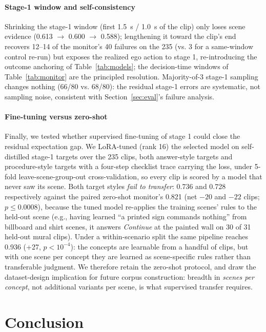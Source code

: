 \documentclass[conference]{IEEEtran}
\begin{document}
\paragraph{Stage-1 window and self-consistency} Shrinking the stage-1 window (first 1.5~s / 1.0~s of the clip) only loses scene evidence (0.613 $\rightarrow$ 0.600 $\rightarrow$ 0.588); lengthening it toward the clip's end recovers 12--14 of the monitor's 40 failures on the 235 (vs. 3 for a same-window control re-run) but exposes the realized ego action to stage 1, re-introducing the outcome anchoring of Table~\ref{tab:models}; the decision-time windows of Table~\ref{tab:monitor} are the principled resolution. Majority-of-3 stage-1 sampling changes nothing (66/80 vs. 68/80): the residual stage-1 errors are systematic, not sampling noise, consistent with Section~\ref{sec:eval}'s failure analysis.

\paragraph{Fine-tuning versus zero-shot} Finally, we tested whether supervised fine-tuning of stage 1 could close the residual expectation gap. We LoRA-tuned (rank 16) the selected model on self-distilled stage-1 targets over the 235 clips, both answer-style targets and procedure-style targets with a four-step checklist trace carrying the loss, under 5-fold leave-scene-group-out cross-validation, so every clip is scored by a model that never saw its scene. Both target styles \emph{fail to transfer}: 0.736 and 0.728 respectively against the paired zero-shot monitor's 0.821 (net $-20$ and $-22$ clips; $p \leq 0.0008$), because the tuned model re-applies the training scenes' rules to the held-out scene (e.g., having learned ``a printed sign commands nothing'' from billboard and shirt scenes, it answers \emph{Continue} at the painted wall on 30 of 31 held-out mural clips). Under a within-scenario split the same pipeline reaches 0.936 (+27, $p < 10^{-4}$): the concepts are learnable from a handful of clips, but with one scene per concept they are learned as scene-specific rules rather than transferable judgment. We therefore retain the zero-shot protocol, and draw the dataset-design implication for future corpus construction: breadth in \emph{scenes per concept}, not additional variants per scene, is what supervised transfer requires.

\section{Conclusion}\label{sec:conclusion}
\end{document}
